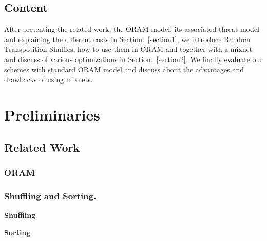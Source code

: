 \documentclass[conference]{IEEEtran}
\newcommand{\raphael}[1]{\textcolor{blue}{Raphael: #1}}
\begin{document}
\subsection{Content}
After presenting the related work, the ORAM model, its associated threat model and explaining the different costs in Section.~\ref{section1}, we introduce Random Transposition Shuffles, how to use them in ORAM and together with a mixnet and discuss of various optimizations in Section.~\ref{section2}.
We finally evaluate our schemes with standard ORAM model and discuss about the advantages and drawbacks of using mixnets.


\section{Preliminaries}
\label{Prelim}

\subsection{Related Work}
\subsubsection{ORAM}

\subsubsection{Shuffling and Sorting.}

\noindent\textbf{Shuffling}
\iffalse
\raphael{Melbourne Shuffle intro for inspiration}
A shufﬂe is an algorithm for rearranging an array to achieve a random permutation of its elements.
Early shufﬂe methods were motivated by the problem of shufﬂing a deck of cards.
Classic card shufﬂe methods(e.g.,Knuth(orFisher-Yates)[17],the rifﬂe shufﬂe[2],Thorp shufﬂe[24]) are not data-oblivious, however, as anyone observing card swaps or rifﬂes (interleaving two subdecks) of such methods can learn the ﬁnal output permutation.
In ICALP 2012, Goodrich and Mitzenmacher [10] showed that one can,in fact,shufﬂe a deck of n cards and guarantee that an observer cannot ﬁnd a particular card in the output permutation with probability better than O(1/n).
However, this algorithm is not an effective shufﬂe for our purposes,since the output permutations produced by the algorithm are not allequally likely and there may be dependencies between large groups of cards that could be leaked.
Most other existing efﬁcient data-oblivious shufﬂing methods assign random values to the elements of the array and use a dataoblivious algorithm to sort the array according to these values.
\fi
\noindent\textbf{Sorting} \\
\end{document}
